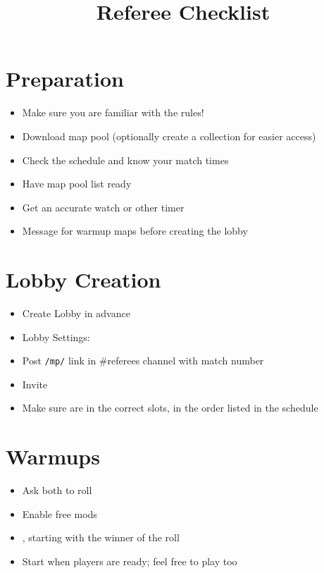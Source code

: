 \title{\nameshort{} Referee Checklist}
\author{}
\date{}



\maketitle

\section{Preparation}
\begin{itemize}
	\item Make sure you are familiar with the rules!
	\item Download map pool (optionally create a collection for easier access)
	\item Check the schedule and know your match times
	\item Have map pool list ready
	\item Get an accurate watch or other timer
	\item Message  for warmup maps before creating the lobby
\end{itemize}

\section{Lobby Creation}

\begin{itemize}
	\item Create Lobby \lobbyopen in advance
	\item Lobby Settings:
	
	\item Post \texttt{/mp/} link in \#referees channel with match number
	\item Invite 
	\item Make sure  are in the correct slots, in the order listed in the schedule
\end{itemize}

\section{Warmups}

\begin{itemize}
	\item Ask both  to roll
	\item Enable free mods
	\item {}, starting with the winner of the roll
	\item Start when players are ready; feel free to play too
\end{itemize}

